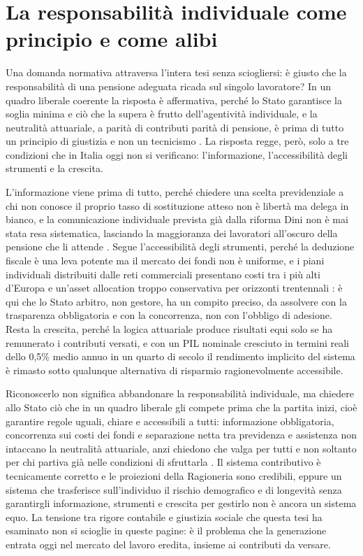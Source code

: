 \section*{La responsabilità individuale come principio e come alibi}

\noindent
Una domanda normativa attraversa l'intera tesi senza sciogliersi: è giusto che la
responsabilità di una pensione adeguata ricada sul singolo lavoratore? In un quadro
liberale coerente la risposta è affermativa, perché lo Stato garantisce la soglia
minima e ciò che la supera è frutto dell'agentività individuale, e la neutralità
attuariale, a parità di contributi parità di pensione, è prima di tutto un principio
di giustizia e non un tecnicismo \cite{Bosi2018}. La risposta regge, però, solo a tre
condizioni che in Italia oggi non si verificano: l'informazione, l'accessibilità
degli strumenti e la crescita.

L'informazione viene prima di tutto, perché chiedere una scelta previdenziale a chi
non conosce il proprio tasso di sostituzione atteso non è libertà ma delega in
bianco, e la comunicazione individuale prevista già dalla riforma Dini non è mai
stata resa sistematica, lasciando la maggioranza dei lavoratori all'oscuro della
pensione che li attende \cite{Fornero2018, Padula2024}. Segue l'accessibilità degli
strumenti, perché la deduzione fiscale è una leva potente ma il mercato dei fondi non
è uniforme, e i piani individuali distribuiti dalle reti commerciali presentano costi
tra i più alti d'Europa e un'asset allocation troppo conservativa per orizzonti
trentennali \cite{FrancoTommasino2020}: è qui che lo Stato arbitro, non gestore, ha
un compito preciso, da assolvere con la trasparenza obbligatoria e con la
concorrenza, non con l'obbligo di adesione. Resta la crescita, perché la logica
attuariale produce risultati equi solo se ha remunerato i contributi versati, e con
un PIL nominale cresciuto in termini reali dello 0,5\% medio annuo in un quarto di
secolo \cite{MEF_RGS2025} il rendimento implicito del sistema è rimasto sotto
qualunque alternativa di risparmio ragionevolmente accessibile.

Riconoscerlo non significa abbandonare la responsabilità individuale, ma chiedere
allo Stato ciò che in un quadro liberale gli compete prima che la partita inizi, cioè
garantire regole uguali, chiare e accessibili a tutti: informazione obbligatoria,
concorrenza sui costi dei fondi e separazione netta tra previdenza e assistenza non
intaccano la neutralità attuariale, anzi chiedono che valga per tutti e non soltanto
per chi partiva già nelle condizioni di sfruttarla \cite{Artoni2014}. Il sistema
contributivo è tecnicamente corretto e le proiezioni della Ragioneria sono credibili,
eppure un sistema che trasferisce sull'individuo il rischio demografico e di
longevità senza garantirgli informazione, strumenti e crescita per gestirlo non è
ancora un sistema equo. La tensione tra rigore contabile e giustizia sociale che
questa tesi ha esaminato non si scioglie in queste pagine: è il problema che la
generazione entrata oggi nel mercato del lavoro eredita, insieme ai contributi da
versare.
